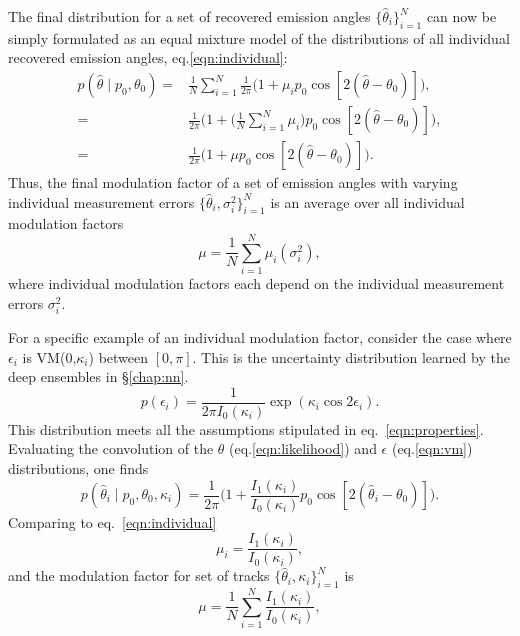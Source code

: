 The final distribution for a set of recovered emission angles $\{\hat{\theta}_i\}^N_{i=1}$ can now be simply formulated as an equal mixture model of the distributions of all individual recovered emission angles, eq.\ref{eqn:individual}:
\begin{eqnarray}
    p(\hat{\theta}\mid p_0,\theta_0) =& \frac{1}{N}\sum_{i=1}^N\frac{1}{2\pi} \big(1 + \mu_ip_0\cos[2(\hat{\theta} - \theta_0)] \big),\\
    =& \frac{1}{2\pi} \big(1 + \big( \frac{1}{N}\sum_{i=1}^N \mu_i \big)p_0\cos[2(\hat{\theta} - \theta_0)] \big),\\
    =& \frac{1}{2\pi} \big(1 + \mu p_0\cos[2(\hat{\theta} - \theta_0)] \big).
    \label{eqn:mix}
\end{eqnarray}
Thus, the final modulation factor of a set of emission angles with varying individual measurement errors $\{\hat{\theta}_i, \sigma_i^2\}^N_{i=1}$ is an average over all individual modulation factors 
\begin{equation}
    \mu = \frac{1}{N}\sum_{i=1}^N \mu_i(\sigma_i^2),
\end{equation}
where individual modulation factors each depend on the individual measurement errors $\sigma_i^2$.

For a specific example of an individual modulation factor, consider the case where $\epsilon_i$ is VM(0,$\kappa_i$) between $[0,\pi]$. This is the uncertainty distribution learned by the deep ensembles in \S\ref{chap:nn}. 
\begin{equation}
p(\epsilon_i) = \frac{1}{2\pi I_0(\kappa_i)}\exp(\kappa_i\cos2\epsilon_i).
\label{eqn:vm}
\end{equation}
This distribution meets all the assumptions stipulated in eq.~\ref{eqn:properties}. Evaluating the convolution of the $\theta$ (eq.\ref{eqn:likelihood}) and $\epsilon$ (eq.\ref{eqn:vm}) distributions, one finds
\begin{equation}
    p(\hat{\theta}_i\mid p_0, \theta_0, \kappa_i) = \frac{1}{2\pi} \big(1 + \frac{I_1(\kappa_i)}{I_0(\kappa_i)}p_0\cos[2(\hat{\theta}_i - \theta_0)] \big).
    \label{eqn:vm_hat}
\end{equation}
Comparing to eq.~\ref{eqn:individual}
\begin{equation}
    \mu_i = \frac{I_1(\kappa_i)}{I_0(\kappa_i)},
    \label{eqn:weight_func}
\end{equation}
and the modulation factor for set of tracks $\{\hat{\theta}_i, \kappa_i\}^N_{i=1}$ is 
\begin{equation}
    \mu = \frac{1}{N}\sum_{i=1}^N \frac{I_1(\kappa_i)}{I_0(\kappa_i)},
\end{equation}


